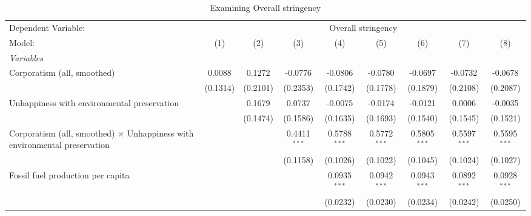 
\begin{table}[htbp]
   \caption{Examining Overall stringency}
   \centering
   \begin{tabular}{lcccccccc}
      \tabularnewline \midrule \midrule
      Dependent Variable: & \multicolumn{8}{c}{Overall stringency}\\
      Model:                                                                            & (1)                   & (2)      & (3)            & (4)            & (5)            & (6)            & (7)            & (8)\\  
      \midrule
      \emph{Variables}\\
      Corporatism (all, smoothed)                                                       & 0.0088                & 0.1272   & -0.0776        & -0.0806        & -0.0780        & -0.0697        & -0.0732        & -0.0678\\   
                                                                                        & (0.1314)              & (0.2101) & (0.2353)       & (0.1742)       & (0.1778)       & (0.1879)       & (0.2108)       & (0.2087)\\   
      Unhappiness with environmental preservation                                       &                       & 0.1679   & 0.0737         & -0.0075        & -0.0174        & -0.0121        & 0.0006         & -0.0035\\   
                                                                                        &                       & (0.1474) & (0.1586)       & (0.1635)       & (0.1693)       & (0.1540)       & (0.1545)       & (0.1521)\\   
      Corporatism (all, smoothed) $\times$ Unhappiness with environmental preservation  &                       &          & 0.4411$^{***}$ & 0.5788$^{***}$ & 0.5772$^{***}$ & 0.5805$^{***}$ & 0.5597$^{***}$ & 0.5595$^{***}$\\   
                                                                                        &                       &          & (0.1158)       & (0.1026)       & (0.1022)       & (0.1045)       & (0.1024)       & (0.1027)\\   
      Fossil fuel production per capita                                                 &                       &          &                & 0.0935$^{***}$ & 0.0942$^{***}$ & 0.0943$^{***}$ & 0.0892$^{***}$ & 0.0928$^{***}$\\   
                                                                                        &                       &          &                & (0.0232)       & (0.0230)       & (0.0234)       & (0.0242)       & (0.0250)\\   

\end{tabular}
\end{table}
